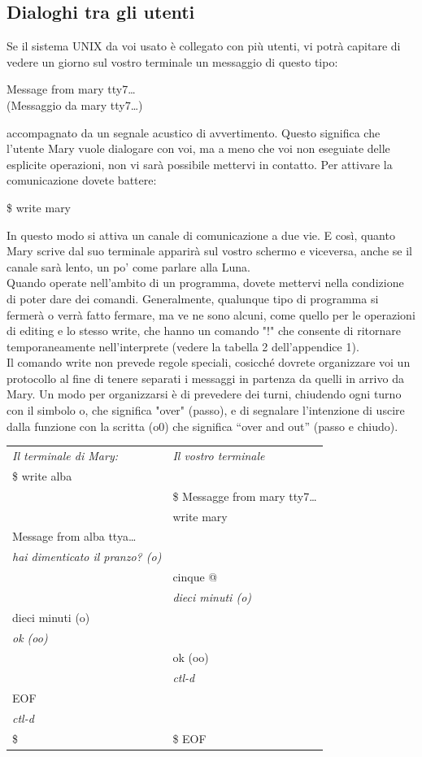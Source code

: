 \subsection{Dialoghi tra gli utenti}
Se il sistema UNIX da voi usato è collegato con più utenti, vi potrà capitare di vedere
un giorno sul vostro terminale un messaggio di questo tipo:
\begin{multicols}{2}
	Message from mary tty7\dots\\
	(Messaggio da mary tty7\dots)
\end{multicols}
accompagnato da un segnale acustico di avvertimento. Questo significa che l'utente
Mary vuole dialogare con voi, ma a meno che voi non eseguiate delle esplicite operazioni,
non vi sarà possibile mettervi in contatto. Per attivare la comunicazione dovete
battere:
\begin{multicols}{2}
	\$ write mary\\
\end{multicols}
In questo modo si attiva un canale di comunicazione a due vie. E così, quanto Mary
scrive dal suo terminale apparirà sul vostro schermo e viceversa, anche se il canale sarà
lento, un po' come parlare alla Luna.\\
Quando operate nell'ambito di un programma, dovete mettervi nella condizione di
poter dare dei comandi. Generalmente, qualunque tipo di programma si fermerà o
verrà fatto fermare, ma ve ne sono alcuni, come quello per le operazioni di editing e
lo stesso write, che hanno un comando "!" che consente di ritornare temporaneamente
nell'interprete (vedere la tabella 2 dell'appendice 1).\\
Il comando write non prevede regole speciali, cosicché dovrete organizzare voi un
protocollo al fine di tenere separati i messaggi in partenza da quelli in arrivo da Mary.
Un modo per organizzarsi è di prevedere dei turni, chiudendo ogni turno con il
simbolo o, che significa "over" (passo), e di segnalare l'intenzione di uscire dalla
funzione con la scritta (o0) che significa ``over and out'' (passo e chiudo).\\
\begin{tabular}{ll}
	{\it Il terminale di Mary:} &{\it Il vostro terminale}\\
	\$ write alba\\
	&\$ Messagge from mary tty7\dots\\
	&write mary\\
	Message from alba ttya\dots\\
	{\it hai dimenticato il pranzo? (o)}\\
	& cinque @\\
	& {\it dieci minuti (o)}\\
	dieci minuti (o)\\
	{\it ok (oo)}\\
	&ok (oo)\\
	&{\it ctl-d}\\
	EOF\\
	{\it ctl-d}\\
	\$ & \$ EOF
\end{tabular}\\
